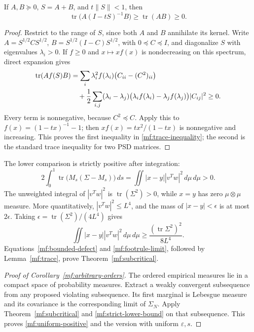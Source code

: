 \begin{lemma}\label{mf:trace}
If \(A,B\succeq0\), \(S=A+B\), and \(t\|S\|<1\), then
\begin{equation}\label{mf:trace-inequality}
 \operatorname{tr}\bigl(A(I-tS)^{-1}B\bigr)
       \ge\operatorname{tr}(AB)\ge0.
\end{equation}
\end{lemma}
\begin{proof}
Restrict to the range of \(S\), since both \(A\) and \(B\) annihilate
its kernel. Write
\(A=S^{1/2}CS^{1/2}\), \(B=S^{1/2}(I-C)S^{1/2}\), with
\(0\preceq C\preceq I\), and diagonalize \(S\) with eigenvalues
\(\lambda_i>0\).
If \(f\ge0\) and \(x\mapsto xf(x)\) is nondecreasing on this spectrum,
direct expansion gives
\begin{align}
 \operatorname{tr}(Af(S)B)
 &=\sum_i\lambda_i^2f(\lambda_i)
                   \bigl(C_{ii}-(C^2)_{ii}\bigr)\notag\\
 &\quad+\frac12\sum_{i,j}(\lambda_i-\lambda_j)
       \bigl(\lambda_if(\lambda_i)-\lambda_jf(\lambda_j)\bigr)
                        |C_{ij}|^2\ge0.\label{mf:trace-expansion}
\end{align}
Every term is nonnegative, because \(C^2\preceq C\).
Apply this to \(f(x)=(1-tx)^{-1}-1\);
then \(xf(x)=tx^2/(1-tx)\) is nonnegative and increasing.
This proves the first inequality in \eqref{mf:trace-inequality};
the second is the standard trace inequality for two PSD matrices.
\end{proof}

The lower comparison is strictly positive after integration:
\begin{equation}\label{mf:strict-trace}
 2\int_0^1\operatorname{tr}\bigl(M_s(\Sigma-M_s)\bigr)\,ds
 =\iint|x-y||v^Tw|^2\,d\mu\,d\mu>0.
\end{equation}
The unweighted integral of \(|v^Tw|^2\) is
\(\operatorname{tr}(\Sigma^2)>0\), while \(x=y\) has zero
\(\mu\otimes\mu\) measure.
More quantitatively, \(|v^Tw|^2\le L^4\), and the mass of
\(|x-y|<\epsilon\) is at most \(2\epsilon\).
Taking \(\epsilon=\operatorname{tr}(\Sigma^2)/(4L^4)\) gives
\begin{equation}\label{mf:strict-lower-bound}
 \iint|x-y||v^Tw|^2\,d\mu\,d\mu
 \ge\frac{(\operatorname{tr}\Sigma^2)^2}{8L^4}.
\end{equation}
Equations~\eqref{mf:bounded-defect} and \eqref{mf:footrule-limit},
followed by Lemma~\ref{mf:trace}, prove
Theorem~\ref{mf:subcritical}.

\begin{proof}[Proof of Corollary~\ref{mf:arbitrary-orders}]
The ordered empirical measures lie in a compact space of probability
measures. Extract a weakly convergent subsequence from any proposed
violating subsequence. Its first marginal is Lebesgue measure and its
covariance is the corresponding limit of \(\Sigma_N\).
Apply Theorem~\ref{mf:subcritical} and
\eqref{mf:strict-lower-bound} on that subsequence.
This proves \eqref{mf:uniform-positive} and the version with uniform
\(\varepsilon,s\).
\end{proof}

